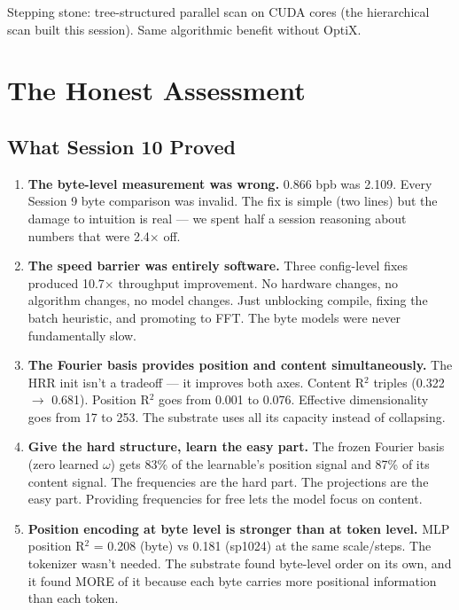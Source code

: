 \documentclass[11pt,a4paper]{report}
\begin{document}
Stepping stone: tree-structured parallel scan on CUDA cores (the hierarchical scan built this session). Same algorithmic benefit without OptiX.


\part{The Honest Assessment}

\chapter{What Session 10 Proved}

\begin{enumerate}
\item \textbf{The byte-level measurement was wrong.} 0.866 bpb was 2.109. Every Session 9 byte comparison was invalid. The fix is simple (two lines) but the damage to intuition is real --- we spent half a session reasoning about numbers that were 2.4$\times$ off.

\item \textbf{The speed barrier was entirely software.} Three config-level fixes produced 10.7$\times$ throughput improvement. No hardware changes, no algorithm changes, no model changes. Just unblocking compile, fixing the batch heuristic, and promoting to FFT. The byte models were never fundamentally slow.

\item \textbf{The Fourier basis provides position and content simultaneously.} The HRR init isn't a tradeoff --- it improves both axes. Content R$^2$ triples (0.322 $\to$ 0.681). Position R$^2$ goes from 0.001 to 0.076. Effective dimensionality goes from 17 to 253. The substrate uses all its capacity instead of collapsing.

\item \textbf{Give the hard structure, learn the easy part.} The frozen Fourier basis (zero learned $\omega$) gets 83\% of the learnable's position signal and 87\% of its content signal. The frequencies are the hard part. The projections are the easy part. Providing frequencies for free lets the model focus on content.

\item \textbf{Position encoding at byte level is stronger than at token level.} MLP position R$^2$ = 0.208 (byte) vs 0.181 (sp1024) at the same scale/steps. The tokenizer wasn't needed. The substrate found byte-level order on its own, and it found MORE of it because each byte carries more positional information than each token.


\end{enumerate}
\end{document}
